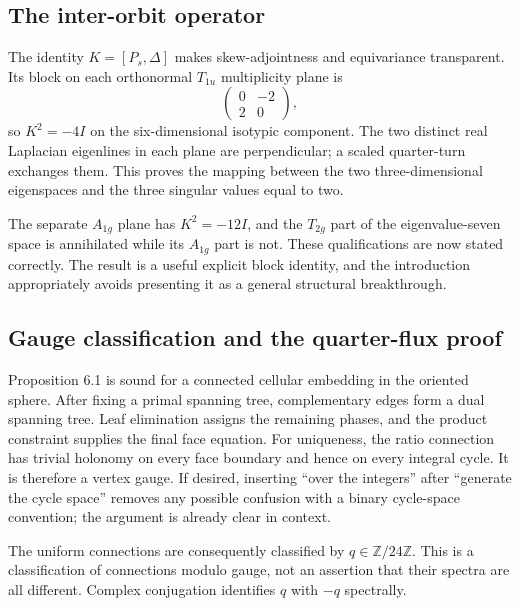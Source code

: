 \documentclass[11pt,a4paper]{article}
\begin{document}
\subsection{The inter-orbit operator}
The identity $K=[P_s,\Delta]$ makes skew-adjointness and equivariance transparent. Its block on each orthonormal $T_{1u}$ multiplicity plane is
\[
\begin{pmatrix}0&-2\\2&0\end{pmatrix},
\]
so $K^2=-4I$ on the six-dimensional isotypic component. The two distinct real Laplacian eigenlines in each plane are perpendicular; a scaled quarter-turn exchanges them. This proves the mapping between the two three-dimensional eigenspaces and the three singular values equal to two.

The separate $A_{1g}$ plane has $K^2=-12I$, and the $T_{2g}$ part of the eigenvalue-seven space is annihilated while its $A_{1g}$ part is not. These qualifications are now stated correctly. The result is a useful explicit block identity, and the introduction appropriately avoids presenting it as a general structural breakthrough.

\subsection{Gauge classification and the quarter-flux proof}
Proposition 6.1 is sound for a connected cellular embedding in the oriented sphere. After fixing a primal spanning tree, complementary edges form a dual spanning tree. Leaf elimination assigns the remaining phases, and the product constraint supplies the final face equation. For uniqueness, the ratio connection has trivial holonomy on every face boundary and hence on every integral cycle. It is therefore a vertex gauge. If desired, inserting ``over the integers'' after ``generate the cycle space'' removes any possible confusion with a binary cycle-space convention; the argument is already clear in context.

The uniform connections are consequently classified by $q\in\mathbb Z/24\mathbb Z$. This is a classification of connections modulo gauge, not an assertion that their spectra are all different. Complex conjugation identifies $q$ with $-q$ spectrally.
\end{document}
